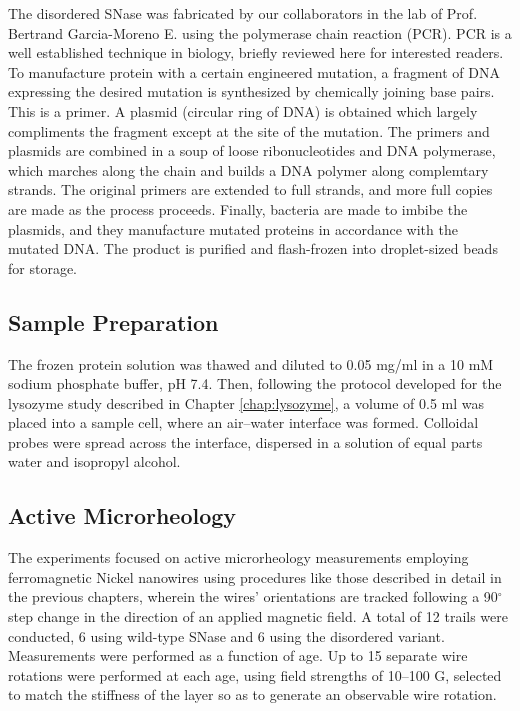 The disordered SNase was fabricated by our collaborators in the lab of Prof. Bertrand Garcia-Moreno E. using the polymerase chain reaction (PCR). PCR is a well established technique in biology, briefly reviewed here for interested readers. To manufacture protein with a certain engineered mutation, a fragment of DNA expressing the desired mutation is synthesized by chemically joining base pairs. This is a primer. A plasmid (circular ring of DNA) is obtained which largely compliments the fragment except at the site of the mutation. The primers and plasmids are combined in a soup of loose ribonucleotides and DNA polymerase, which marches along the chain and builds a DNA polymer along complemtary strands. The original primers are extended to full strands, and more full copies are made as the process proceeds. Finally, bacteria are made to imbibe the plasmids, and they manufacture mutated proteins in accordance with the mutated DNA. The product is purified and flash-frozen into droplet-sized beads for storage.

\subsection{Sample Preparation}

The frozen protein solution was thawed and diluted to 0.05 mg/ml in a 10 mM sodium phosphate buffer, pH 7.4. Then, following the protocol developed for the lysozyme study described in Chapter \ref{chap:lysozyme}, a volume of 0.5 ml was placed into a sample cell, where an air--water interface was formed. Colloidal probes were spread across the interface, dispersed in a solution of equal parts water and isopropyl alcohol.

\subsection{Active Microrheology}

The experiments focused on active microrheology measurements employing ferromagnetic Nickel nanowires using procedures like those described in detail in the previous chapters, wherein the wires' orientations are tracked following a 90$^\circ$ step change in the direction of an applied magnetic field. A total of 12 trails were conducted, 6 using wild-type SNase and 6 using the disordered variant. Measurements were performed as a function of age. Up to 15 separate wire rotations were performed at each age, using field strengths of 10--100 G, selected to match the stiffness of the layer so as to generate an observable wire rotation.



